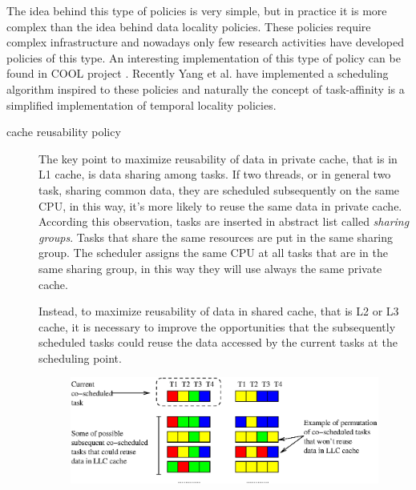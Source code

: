 The idea behind this type of policies is very simple, but in practice it is more complex than the idea behind data locality policies. These policies 
require complex infrastructure and nowadays only few research activities have developed policies of this type. An interesting implementation of this type 
of policy can be found in COOL project \cite{COOL}. Recently Yang et al. \cite{taiwan} have implemented a scheduling algorithm inspired to these policies 
and naturally the concept of task-affinity is a simplified implementation of temporal locality policies.

\begin{description}
\item[cache reusability policy]
The key point to maximize reusability of data in private cache, that is in L1 cache, is data sharing among tasks. If two threads, or in general two task, 
sharing common data, they are scheduled subsequently on the same CPU, in this way, it's more likely to reuse the same data in private cache.
According this observation, tasks are inserted in abstract list called \textit{sharing groups}. Tasks that share the same resources are put in the 
same sharing group. The scheduler assigns the same CPU at all tasks that are in the same sharing group, in this way they will use always the same private 
cache. 

Instead, to maximize reusability of data in shared cache, that is L2 or L3 cache, it is necessary to improve the opportunities that the subsequently 
scheduled tasks could reuse the data accessed by the current tasks at the scheduling point.

\begin{figure}[htbp]
\centering
\includegraphics[width=\widefigure]{images/cosched_permut.eps}
\caption{}
\label{fig:cosched_permutation}
\end{figure}


\end{description}
